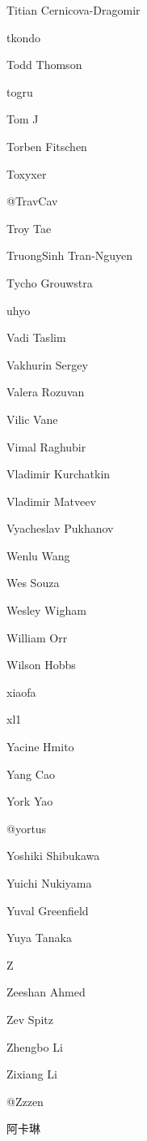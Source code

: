 \begin{DoxyItemize}
\item Titian Cernicova-\/\+Dragomir
\item tkondo
\item Todd Thomson
\item togru
\item Tom J
\item Torben Fitschen
\item Toxyxer
\item @\+Trav\+Cav
\item Troy Tae
\item Truong\+Sinh Tran-\/\+Nguyen
\item Tycho Grouwstra
\item uhyo
\item Vadi Taslim
\item Vakhurin Sergey
\item Valera Rozuvan
\item Vilic Vane
\item Vimal Raghubir
\item Vladimir Kurchatkin
\item Vladimir Matveev
\item Vyacheslav Pukhanov
\item Wenlu Wang
\item Wes Souza
\item Wesley Wigham
\item William Orr
\item Wilson Hobbs
\item xiaofa
\item xl1
\item Yacine Hmito
\item Yang Cao
\item York Yao
\item @yortus
\item Yoshiki Shibukawa
\item Yuichi Nukiyama
\item Yuval Greenfield
\item Yuya Tanaka
\item Z
\item Zeeshan Ahmed
\item Zev Spitz
\item Zhengbo Li
\item Zixiang Li
\item @\+Zzzen
\item 阿卡琳 
\end{DoxyItemize}
